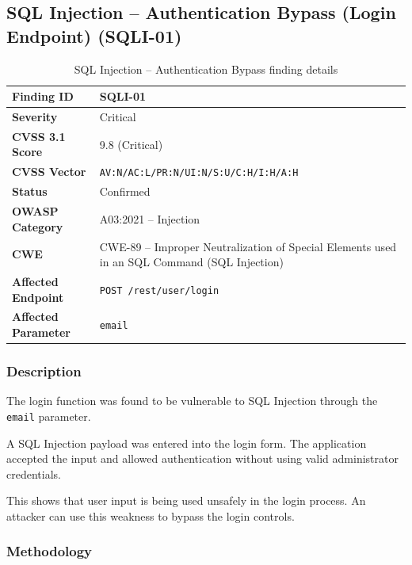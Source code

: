 
\subsection*{SQL Injection -- Authentication Bypass (Login Endpoint) (SQLI-01)}

\begin{table}[H]
\centering
\begin{tabular}{|l|p{10cm}|}
\hline
\textbf{Finding ID} & SQLI-01 \\
\hline
\textbf{Severity} & Critical \\
\hline
\textbf{CVSS 3.1 Score} & 9.8 (Critical) \\
\hline
\textbf{CVSS Vector} & \texttt{AV:N/AC:L/PR:N/UI:N/S:U/C:H/I:H/A:H} \\
\hline
\textbf{Status} & Confirmed \\
\hline
\textbf{OWASP Category} & A03:2021 -- Injection \\
\hline
\textbf{CWE} & CWE-89 -- Improper Neutralization of Special
Elements used in an SQL Command (SQL Injection) \\
\hline
\textbf{Affected Endpoint} & \texttt{POST /rest/user/login} \\
\hline
\textbf{Affected Parameter} & \texttt{email} \\
\hline
\end{tabular}
\caption{SQL Injection -- Authentication Bypass finding details}
\end{table}

\subsubsection*{Description}

The login function was found to be vulnerable to SQL Injection
through the \texttt{email} parameter.

A SQL Injection payload was entered into the login form. The
application accepted the input and allowed authentication without
using valid administrator credentials.

This shows that user input is being used unsafely in the login
process. An attacker can use this weakness to bypass the login
controls.

\subsubsection*{Methodology}

